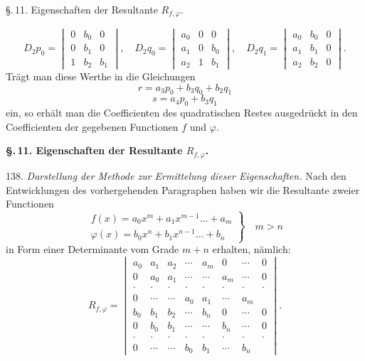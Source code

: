 \documentclass[11pt]{article}
\providecommand{\weberpage}[1]{}
\begin{document}
\weberpage{145}

\begin{center}
\S.\,11. Eigenschaften der Resultante $R_{f,\varphi}$.
\end{center}

\[
D_2p_0 =
\begin{vmatrix}
0 & b_0 & 0 \\
0 & b_1 & 0 \\
1 & b_2 & b_1
\end{vmatrix}, \quad
D_2q_0 =
\begin{vmatrix}
a_0 & 0 & 0 \\
a_1 & 0 & b_0 \\
a_2 & 1 & b_1
\end{vmatrix}, \quad
D_2q_1 =
\begin{vmatrix}
a_0 & b_0 & 0 \\
a_1 & b_1 & 0 \\
a_2 & b_2 & 0
\end{vmatrix}.
\]
Trägt man diese Werthe in die Gleichungen
\[
r = a_3p_0+b_3q_0+b_2q_1
\]
\[
s = a_4p_0+b_3q_1
\]
ein, so erhält man die Coefficienten des quadratischen Restes ausgedrückt in den Coefficienten der gegebenen Functionen $f$ und $\varphi$.

\begin{center}
\textbf{\S.\,11. Eigenschaften der Resultante $R_{f,\varphi}$.}
\end{center}

138. \textit{Darstellung der Methode zur Ermittelung dieser Eigenschaften.} Nach den Entwicklungen des vorhergehenden Paragraphen haben wir die Resultante zweier Functionen
\[
\left.
\begin{array}{l}
f(x) = a_0x^m+a_1x^{m-1}\ldots+a_m \\
\varphi(x) = b_0x^n+b_1x^{n-1}\ldots+b_n
\end{array}
\right\} \quad m>n
\]
in Form einer Determinante vom Grade $m+n$ erhalten, nämlich:
\[
R_{f,\varphi} =
\begin{vmatrix}
a_0 & a_1 & a_2 & \cdots & a_m & 0 & \cdots & 0 \\
0 & a_0 & a_1 & \cdots & \cdots & a_m & \cdots & 0 \\
\cdot & \cdot & \cdot & \cdot & \cdot & \cdot & \cdot & \cdot \\
0 & \cdots & \cdots & a_0 & a_1 & \cdots & a_m & {} \\
b_0 & b_1 & b_2 & \cdots & b_n & 0 & \cdots & 0 \\
0 & b_0 & b_1 & \cdots & \cdots & b_n & \cdots & 0 \\
\cdot & \cdot & \cdot & \cdot & \cdot & \cdot & \cdot & \cdot \\
0 & \cdots & \cdots & b_0 & b_1 & \cdots & b_n & {}
\end{vmatrix}.
\]
\end{document}
